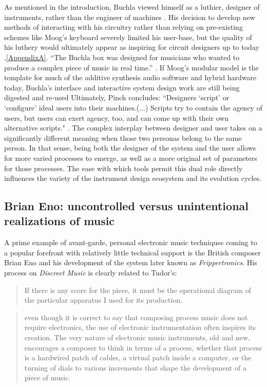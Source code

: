 As mentioned in the introduction, Buchla viewed himself as a luthier, designer of instruments, rather than the engineer of machines \cite{pinch2001}. His decision to develop new methods of interacting with his circuitry rather than relying on pre-existing schemes like Moog's keyboard severely limited his user-base, but the quality of his luthery would ultimately appear as inspiring for circuit designers up to today \cite{rylan2015},\ref{AppendixA}. ``The Buchla box was designed for musicians who wanted to produce a complex piece of music in real time.'' \cite[p47]{pinch2002}. If Moog's modular model is the template for much of the additive synthesis audio software and hybrid hardware today, Buchla's interface and interactive system design work are still being digested and re-used \cite{} Ultimately, Pinch concludes: ``Designers `script' or `configure' ideal users into their machines.(...) Scripts try to contain the agency of users, but users can exert agency, too, and can come up with their own alternative scripts." \cite[p.311]{pinch2002}. The complex interplay between designer and user takes on a significantly different meaning when those two personas belong to the same person. In that sense, being both the designer of the system and the user allows for more varied processes to emerge, as well as a more original set of parameters for those processes. The ease with which tools permit this dual role directly influences the variety of the instrument design ecosystem and its evolution cycles. 

\subsection{Brian Eno: uncontrolled versus unintentional realizations of music}

A prime example of avant-garde, personal electronic music techniques coming to a popular forefront with relatively little technical support is the British composer Brian Eno and his development of the system later known as \emph{Frippertronics}. His process on \emph{Discreet Music} is clearly related to Tudor's: 

\begin{quote}
	If there is any score for the piece, it must be the operational diagram of the particular apparatus I used for its production. 
\end{quote}

\cite{eno1975}

\begin{quote}

even though it is correct to say that composing process music does not require electronics, the use of electronic instrumentation often inspires its creation. The very nature of electronic music instruments, old and new, encourages a composer to think in terms of a process, whether that process is a hardwired patch of cables, a virtual patch inside a computer, or the turning of dials to various increments that shape the development of a piece of music. \cite[p.237]{holmes2002}

\end{quote}


